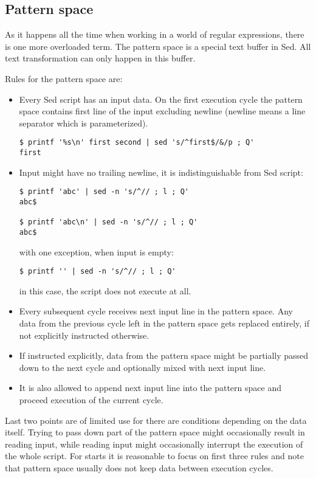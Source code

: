 \subsection{Pattern space}

As it happens all the time when working in a world of regular expressions,
there is one more overloaded term. The pattern space is a special text buffer in Sed.
All text transformation can only happen in this buffer.

Rules for the pattern space are:
\begin{itemize}
	\item Every Sed script has an input data. On the first execution cycle
		the pattern space contains first line of the input
		excluding newline (newline means a line separator which is
		parameterized).
\begin{lstlisting}
$ printf '%s\n' first second | sed 's/^first$/&/p ; Q'
first
\end{lstlisting}
	\item Input might have no trailing newline, it is indistinguishable
		from Sed script:
\begin{lstlisting}
$ printf 'abc' | sed -n 's/^// ; l ; Q'    
abc$

$ printf 'abc\n' | sed -n 's/^// ; l ; Q'
abc$
\end{lstlisting}
		with one exception, when input is empty:
\begin{lstlisting}
$ printf '' | sed -n 's/^// ; l ; Q'
\end{lstlisting}
		in this case, the script does not execute at all.
		\item Every subsequent cycle receives next input line
			in the pattern space. Any data from the previous
			cycle left in the pattern space gets replaced
			entirely, if not explicitly instructed otherwise.
		\item If instructed explicitly, data from the pattern space
			might be partially passed down to the next cycle and
			optionally mixed with next input line.
		\item It is also allowed to append next input line into the
			pattern space and proceed execution of the current cycle.
\end{itemize}

Last two points are of limited use for there are conditions depending on
the data itself. Trying to pass down part of the pattern space might
occasionally result in reading input, while reading input might occasionally
interrupt the execution of the whole script. For starts it is reasonable to
focus on first three rules and note that pattern space usually does not
keep data between execution cycles.

